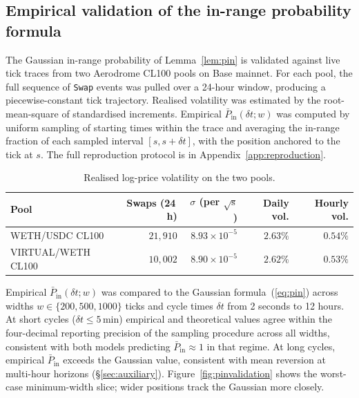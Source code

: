 \documentclass[11pt,a4paper]{article}
\theoremstyle{definition}
\theoremstyle{plain}
\theoremstyle{remark}
\begin{document}
\subsection{Empirical validation of the in-range probability formula}\label{sec:empirical-pin}

The Gaussian in-range probability of Lemma~\ref{lem:pin} is validated against live tick traces from two Aerodrome CL100 pools on Base mainnet. For each pool, the full sequence of \texttt{Swap} events was pulled over a 24-hour window, producing a piecewise-constant tick trajectory. Realised volatility was estimated by the root-mean-square of standardised increments. Empirical $\bar P_{\text{in}}(\delta t; w)$ was computed by uniform sampling of starting times within the trace and averaging the in-range fraction of each sampled interval $[s, s + \delta t]$, with the position anchored to the tick at $s$. The full reproduction protocol is in Appendix~\ref{app:reproduction}.

\begin{table}[H]
\centering
\caption{Realised log-price volatility on the two pools.}
\label{tab:vol}
\small
\begin{tabular}{@{}lrrrr@{}}
\toprule
Pool & Swaps (24\,h) & $\sigma$ (per $\sqrt{\text{s}}$) & Daily vol. & Hourly vol. \\
\midrule
WETH/USDC CL100 & $21{,}910$ & $8.93\times 10^{-5}$ & $2.63\%$ & $0.54\%$ \\
VIRTUAL/WETH CL100 & $10{,}002$ & $8.90\times 10^{-5}$ & $2.62\%$ & $0.53\%$ \\
\bottomrule
\end{tabular}
\end{table}

Empirical $\bar P_{\text{in}}(\delta t; w)$ was compared to the Gaussian formula~(\ref{eq:pin}) across widths $w \in \{200, 500, 1000\}$ ticks and cycle times $\delta t$ from 2 seconds to 12 hours. At short cycles ($\delta t \leq 5$\,min) empirical and theoretical values agree within the four-decimal reporting precision of the sampling procedure across all widths, consistent with both models predicting $\bar P_{\text{in}} \approx 1$ in that regime. At long cycles, empirical $\bar P_{\text{in}}$ exceeds the Gaussian value, consistent with mean reversion at multi-hour horizons (\S\ref{sec:auxiliary}). Figure~\ref{fig:pinvalidation} shows the worst-case minimum-width slice; wider positions track the Gaussian more closely.
\end{document}

